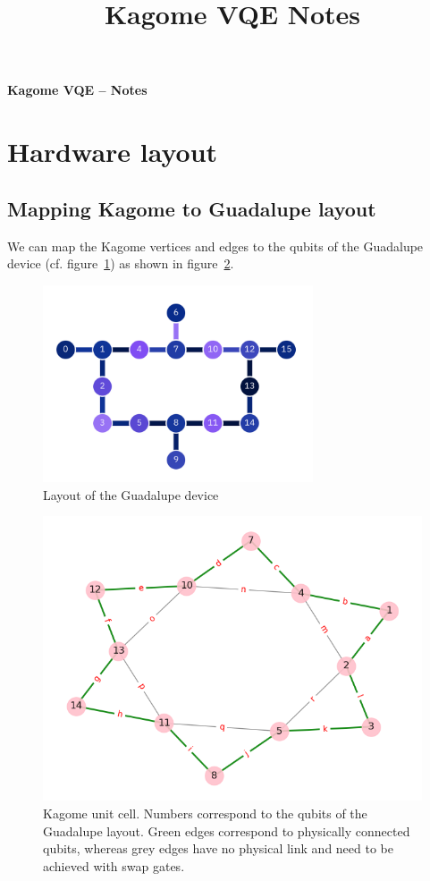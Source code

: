 \documentclass[a4paper,12pt]{article}
\begin{document}
\title{Kagome VQE Notes}
\thispagestyle{empty}
\begin{center}
{\LARGE \bf Kagome VQE -- Notes}\\
\end{center}

\section{Hardware layout}

\subsection{Mapping Kagome to Guadalupe layout}

We can map the Kagome vertices and edges to the qubits of the Guadalupe device (cf. figure~\ref{fig:guadalupe}) as shown in figure~\ref{fig:kagome}.
\begin{figure}[h]
\centering
\includegraphics[width=80mm]{img/ibmq-guadalupe.png} 
\caption{Layout of the Guadalupe device\label{fig:guadalupe}}
\end{figure}

\begin{figure}[h]
\centering
\includegraphics[width=120mm]{img/kagome.png}
\caption{Kagome unit cell. Numbers correspond to the qubits of the Guadalupe layout. Green edges correspond to physically connected qubits, whereas grey edges have no physical link and need to be achieved with swap gates.\label{fig:kagome}}
\end{figure}
\end{document}
